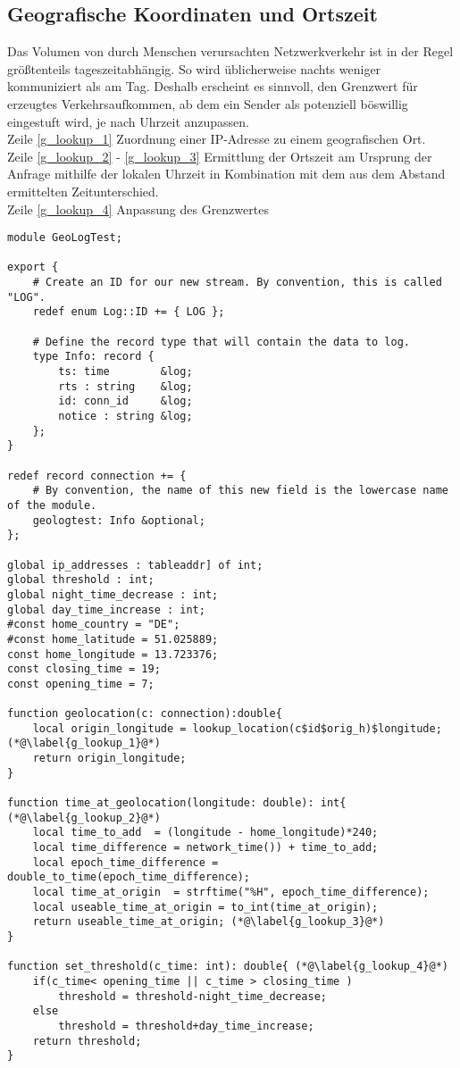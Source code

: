 \subsection{Geografische Koordinaten und Ortszeit}
Das Volumen von durch Menschen verursachten Netzwerkverkehr ist in der Regel größtenteils tageszeitabhängig. So wird üblicherweise nachts weniger kommuniziert als am Tag. Deshalb erscheint es sinnvoll, den Grenzwert für erzeugtes Verkehrsaufkommen, ab dem ein Sender als potenziell böswillig eingestuft wird, je nach Uhrzeit anzupassen.\\
Zeile \ref{g_lookup_1} Zuordnung einer IP-Adresse zu einem geografischen Ort.\\
Zeile \ref{g_lookup_2} - \ref{g_lookup_3} Ermittlung der Ortszeit am Ursprung der Anfrage mithilfe der lokalen Uhrzeit in Kombination mit dem aus dem Abstand ermittelten Zeitunterschied.\\
Zeile \ref{g_lookup_4} Anpassung des Grenzwertes\\
\begin{lstlisting}[consecutivenumbers=false,caption={Geolokalisierung und Setzen des Grenzwertes},firstnumber=31,linerange={31-37,42-54}]
module GeoLogTest;

export {
    # Create an ID for our new stream. By convention, this is called "LOG".
    redef enum Log::ID += { LOG };

    # Define the record type that will contain the data to log.
    type Info: record {
        ts: time        &log;
        rts : string 	&log;
        id: conn_id     &log; 
        notice : string &log;
    };
}

redef record connection += {
    # By convention, the name of this new field is the lowercase name of the module.
    geologtest: Info &optional;
};

global ip_addresses : tableaddr] of int;
global threshold : int; 
global night_time_decrease : int;
global day_time_increase : int;
#const home_country = "DE";
#const home_latitude = 51.025889;
const home_longitude = 13.723376;
const closing_time = 19;
const opening_time = 7;

function geolocation(c: connection):double{
	local origin_longitude = lookup_location(c$id$orig_h)$longitude;(*@\label{g_lookup_1}@*)
	return origin_longitude;
}

function time_at_geolocation(longitude: double): int{ (*@\label{g_lookup_2}@*)
	local time_to_add  = (longitude - home_longitude)*240;
	local time_difference = network_time()) + time_to_add;
	local epoch_time_difference = double_to_time(epoch_time_difference);
	local time_at_origin  = strftime("%H", epoch_time_difference);
	local useable_time_at_origin = to_int(time_at_origin);
	return useable_time_at_origin; (*@\label{g_lookup_3}@*)
}

function set_threshold(c_time: int): double{ (*@\label{g_lookup_4}@*)
	if(c_time< opening_time || c_time > closing_time )
		threshold = threshold-night_time_decrease;
	else 
		threshold = threshold+day_time_increase;
	return threshold; 
}
\end{lstlisting}

